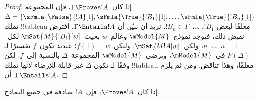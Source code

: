 \documentclass[../../../include/open-logic-section]{subfiles}
\begin{document}
\begin{proof}
  إذا كان~$\Gamma \Proves !A$، فإن المجموعة
  $\Delta = \{\sFmla{\False}{!A}[1], \sFmla{\True}{!B_1}[1],
  \dots, \sFmla{\True}{!B_n}[1]\}$ تملك !!{tableau} مغلقًا لبعض
  $!B_1$، \dots،~$!B_n \in \Gamma$. نريد أن نبيّن أن
  $\Gamma \Entails !A$. افترض نقيض ذلك، فيوجد نموذج~$\mModel{M}$
  وعالم~$w$ بحيث~$\mSat{M}{!B_i}[w]$ لكل~$i=1$، \dots،~$n$،
  ولكن~$\mSat/{M}{!A}[w]$. ولتكن~$f(1) = w$؛ عندئذ تكون~$f$ تفسيرًا
  لـ$P(\Delta)$ في~$\mModel{M}$، ويرضي~$\mModel{M}$ المجموعة~$\Delta$
  بالنسبة إلى~$f$. لكن وفقًا لـ تكون
  $\Delta$ غير قابلة للإرضاء لأنها تملك !!{tableau} مغلقًا، وهذا تناقض.
  ومن ثم يلزم أن~$\Gamma \Entails !A$.
\end{proof}

\begin{cor}
إذا كان~$\Proves !A$، فإن~$!A$ صادقة في جميع النماذج.
\end{cor}
\end{document}
